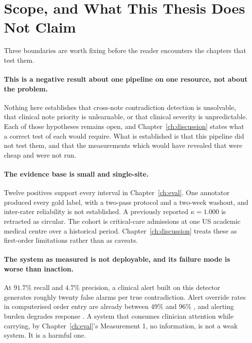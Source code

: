 \section{Scope, and What This Thesis Does Not Claim}
\label{sec:intro-scope}

Three boundaries are worth fixing before the reader encounters the chapters that
test them.

\paragraph{This is a negative result about one pipeline on one resource, not
about the problem.} Nothing here establishes that cross-note contradiction
detection is unsolvable, that clinical note priority is unlearnable, or that
clinical severity is unpredictable. Each of those hypotheses remains open, and
Chapter~\ref{ch:discussion} states what a correct test of each would require.
What is established is that this pipeline did not test them, and that the
measurements which would have revealed that were cheap and were not run.

\paragraph{The evidence base is small and single-site.} Twelve positives
support every interval in Chapter~\ref{ch:eval}. One annotator produced every
gold label, with a two-pass protocol and a two-week washout, and inter-rater
reliability is not established. A previously reported $\kappa = 1.000$ is
retracted as circular. The cohort is critical-care admissions at one US academic
medical centre over a historical period. Chapter~\ref{ch:discussion} treats
these as first-order limitations rather than as caveats.

\paragraph{The system as measured is not deployable, and its failure mode is
worse than inaction.} At $91.7\%$ recall and $4.7\%$ precision, a clinical
alert built on this detector generates roughly twenty false alarms per true
contradiction. Alert override rates in computerised order entry are already
between $49\%$ and $96\%$ \citep{vandersijs2006overriding}, and alerting burden
degrades response \citep{ancker2017alertfatigue}. A system that consumes
clinician attention while carrying, by Chapter~\ref{ch:eval}'s Measurement 1,
no information, is not a weak system. It is a harmful one.

